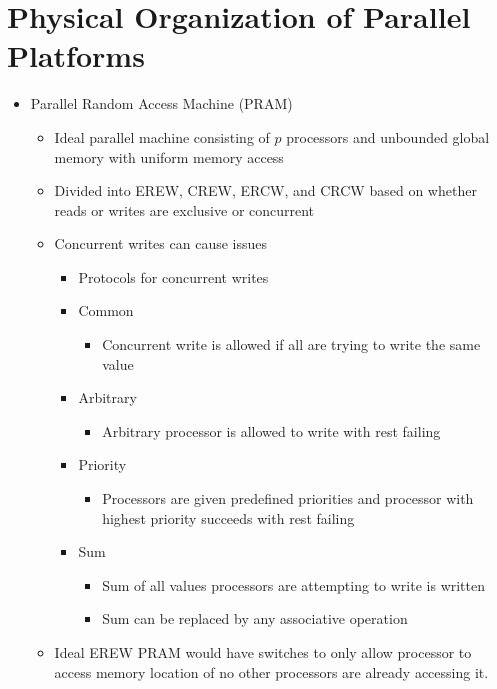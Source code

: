 \documentclass[a4paper]{article}
\begin{document}
\section{Physical Organization of Parallel Platforms}
\begin{itemize}
  \item Parallel Random Access Machine (PRAM)
    \begin{itemize}
      \item Ideal parallel machine consisting of $p$ processors and unbounded global memory with uniform memory access
      \item Divided into EREW, CREW, ERCW, and CRCW based on whether reads or writes are exclusive or concurrent
      \item Concurrent writes can cause issues
        \begin{itemize}
          \item Protocols for concurrent writes
        \end{itemize}
        \begin{itemize}
          \item Common
            \begin{itemize}
              \item Concurrent write is allowed if all are trying to write the same value
            \end{itemize}
          \item Arbitrary
            \begin{itemize}
              \item Arbitrary processor is allowed to write with rest failing
            \end{itemize}
          \item Priority
            \begin{itemize}
              \item Processors are given predefined priorities and processor with highest priority succeeds with rest failing
            \end{itemize}
          \item Sum
            \begin{itemize}
              \item Sum of all values processors are attempting to write is written
              \item Sum can be replaced by any associative operation
            \end{itemize}
        \end{itemize}
      \item Ideal EREW PRAM would have switches to only allow processor to access memory location of no other processors are already accessing it.

\end{itemize}
\end{itemize}
\end{document}
